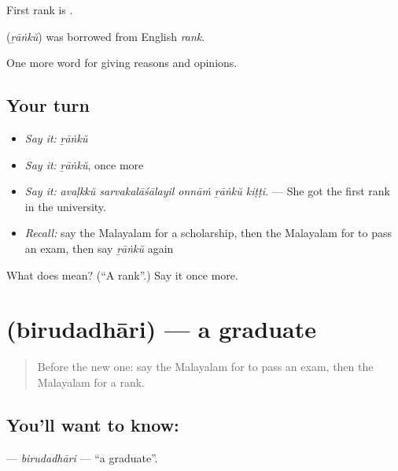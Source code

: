 First rank is  .

\begin{cousinweb}
\textbf{} (\emph{ṟāṅkŭ}) was borrowed from English \emph{rank}.
\end{cousinweb}

\begin{grammarlens}[title={What you've built}]
One more word for giving reasons and opinions.
\end{grammarlens}

\subsection*{Your turn}
\begin{itemize}
\raggedright
  \item \emph{Say it:} \emph{ṟāṅkŭ}
  \item \emph{Say it:} \emph{ṟāṅkŭ}, once more
  \item \emph{Say it:} \emph{avaḷkkŭ sarvakalāśālayil onnāṁ ṟāṅkŭ kiṭṭi.} — She got the first rank in the university.
  \item \emph{Recall:} say the Malayalam for a scholarship, then the Malayalam for to pass an exam, then say \emph{ṟāṅkŭ} again
\end{itemize}

\begin{tcolorbox}[breakable,colback=teal!4,colframe=teal!35!black,title={Before you move on}]
What does  mean? (\textquotedblleft{}A rank\textquotedblright{}.) Say it once more.
\end{tcolorbox}
\section[\texorpdfstring{\ml{ബിരുദധാരി} (birudadhāri)}{ബിരുദധാരി (birudadhāri)}]{ (birudadhāri) — a graduate}

\label{lesson:ML-C435-birudadhari}



\begin{quote}
Before the new one: say the Malayalam for to pass an exam, then the Malayalam for a rank.
\end{quote}

\subsection*{You'll want to know: }
\textbf{} — \emph{birudadhāri} — \textquotedblleft{}a graduate\textquotedblright{}.

